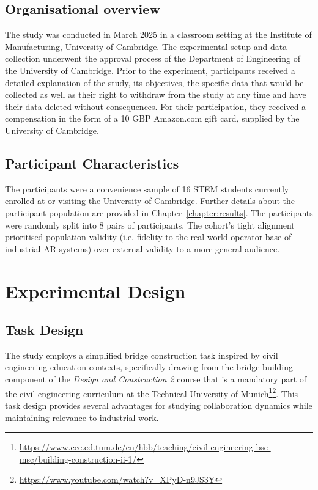\subsection{Organisational overview}\label{subsec:organisational-overview}
The study was conducted in March 2025 in a classroom setting at the Institute of Manufacturing, University of Cambridge. The experimental setup and data collection underwent the approval process of the Department of Engineering of the University of Cambridge. Prior to the experiment, participants received a detailed explanation of the study, its objectives, the specific data that would be collected as well as their right to withdraw from the study at any time and have their data deleted without consequences. For their participation, they received a compensation in the form of a 10 GBP Amazon.com gift card, supplied by the University of Cambridge.

\subsection{Participant Characteristics}\label{subsec:participant-characteristics}
The participants were a convenience sample of 16 STEM students currently enrolled at or visiting the University of Cambridge. Further details about the participant population are provided in Chapter~\ref{chapter:results}.
The participants were randomly split into 8 pairs of participants. The cohort's tight alignment prioritised population validity (i.e. fidelity to the real-world operator base of industrial AR systems) over external validity to a more general audience.


\section{Experimental Design}\label{sec:experimental-design}
\subsection{Task Design}\label{subsec:task-design}
The study employs a simplified bridge construction task inspired by civil engineering education contexts, specifically drawing from the bridge building component of the \emph{Design and Construction 2} course that is a mandatory part of the civil engineering curriculum at the Technical University of Munich\footnote{\url{https://www.cee.ed.tum.de/en/hbb/teaching/civil-engineering-bsc-msc/building-construction-ii-1/}}\footnote{\url{https://www.youtube.com/watch?v=XPyD-n9JS3Y}}. This task design provides several advantages for studying collaboration dynamics while maintaining relevance to industrial work.


